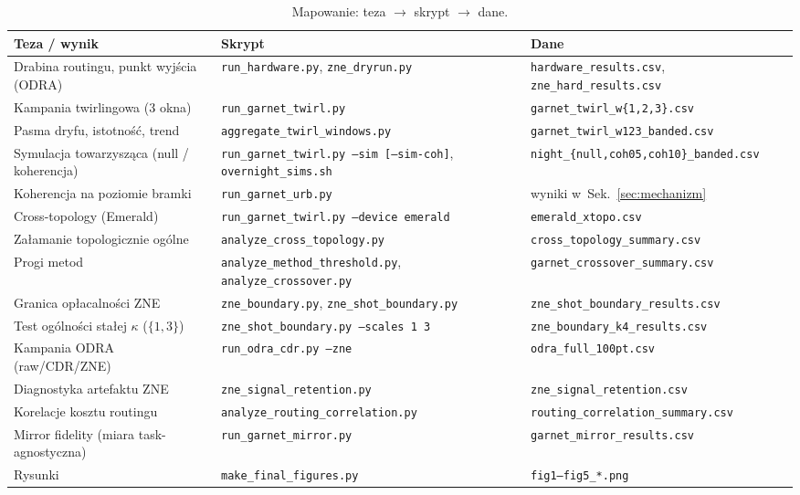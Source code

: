 \documentclass[11pt]{article}
\begin{document}
\begin{table}[!ht]\centering
\caption{Mapowanie: teza $\to$ skrypt $\to$ dane.}
\label{tab:repo}
\footnotesize\begin{tabular}{p{4.0cm}p{4.6cm}p{5.4cm}}
\toprule
Teza / wynik & Skrypt & Dane \\
\midrule
Drabina routingu, punkt wyjścia (ODRA) & \texttt{run\_hardware.py}, \texttt{zne\_dryrun.py} &
  \texttt{hardware\_results.csv}, \texttt{zne\_hard\_results.csv} \\
Kampania twirlingowa (3 okna) & \texttt{run\_garnet\_twirl.py} &
  \texttt{garnet\_twirl\_w\{1,2,3\}.csv} \\
Pasma dryfu, istotność, trend & \texttt{aggregate\_twirl\_windows.py} &
  \texttt{garnet\_twirl\_w123\_banded.csv} \\
Symulacja towarzysząca (null / koherencja) & \texttt{run\_garnet\_twirl.py --sim [--sim-coh]},
  \texttt{overnight\_sims.sh} & \texttt{night\_\{null,coh05,coh10\}\_banded.csv} \\
Koherencja na poziomie bramki & \texttt{run\_garnet\_urb.py} & wyniki w~Sek.~\ref{sec:mechanizm} \\
Cross-topology (Emerald) & \texttt{run\_garnet\_twirl.py --device emerald} &
  \texttt{emerald\_xtopo.csv} \\
Załamanie topologicznie ogólne & \texttt{analyze\_cross\_topology.py} &
  \texttt{cross\_topology\_summary.csv} \\
Progi metod & \texttt{analyze\_method\_threshold.py}, \texttt{analyze\_crossover.py} &
  \texttt{garnet\_crossover\_summary.csv} \\
Granica opłacalności ZNE & \texttt{zne\_boundary.py}, \texttt{zne\_shot\_boundary.py} &
  \texttt{zne\_shot\_boundary\_results.csv} \\
Test ogólności stałej $\kappa$ ($\{1,3\}$) & \texttt{zne\_shot\_boundary.py --scales 1 3} &
  \texttt{zne\_boundary\_k4\_results.csv} \\
Kampania ODRA (raw/CDR/ZNE) & \texttt{run\_odra\_cdr.py --zne} &
  \texttt{odra\_full\_100pt.csv} \\
Diagnostyka artefaktu ZNE & \texttt{zne\_signal\_retention.py} &
  \texttt{zne\_signal\_retention.csv} \\
Korelacje kosztu routingu & \texttt{analyze\_routing\_correlation.py} &
  \texttt{routing\_correlation\_summary.csv} \\
Mirror fidelity (miara task-agnostyczna) & \texttt{run\_garnet\_mirror.py} &
  \texttt{garnet\_mirror\_results.csv} \\
Rysunki & \texttt{make\_final\_figures.py} & \texttt{fig1--fig5\_*.png} \\
\bottomrule
\end{tabular}
\end{table}
\end{document}

